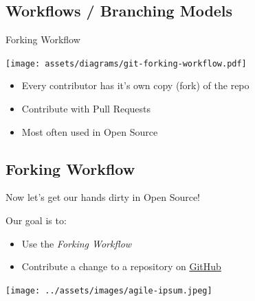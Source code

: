 \subsection{Workflows / Branching Models}
\begin{frame}[fragile]
  \subslidetitle
  Forking Workflow
    \centerline{\texttt{[image: assets/diagrams/git-forking-workflow.pdf]}}

  \vspace{2em}
  \begin{itemize}
    \item Every contributor has it's own copy (fork) of the repo
    \item Contribute with Pull Requests
    \item Most often used in Open Source
  \end{itemize}

\end{frame}

\subsection{Forking Workflow}
\begin{frame}[fragile]
  \subslidetitle

  Now let's get our hands dirty in Open Source! \\
  \vspace{1em}

  Our goal is to:
  \begin{itemize}
    \item Use the \textit{Forking Workflow}
    \item Contribute a change to a repository on \href{https://github.com}{GitHub}
  \end{itemize}

  \centerline{\texttt{[image: ../assets/images/agile-ipsum.jpeg]}}

\end{frame}

